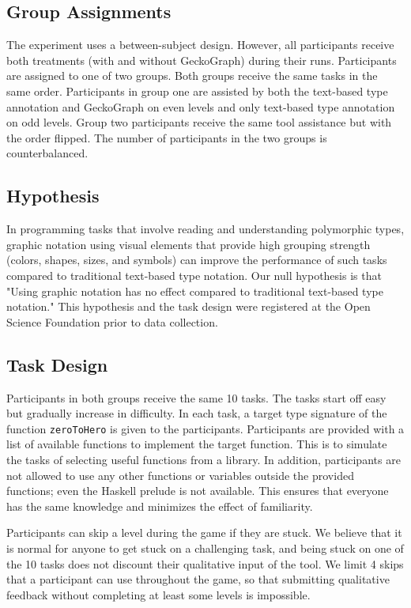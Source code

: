 \subsection{Group Assignments}

The experiment uses a between-subject design. However, all participants receive both treatments (with and without GeckoGraph) during their runs.
Participants are assigned to one of two groups. Both groups receive the same tasks in the same order. Participants in group one are assisted by both the text-based type annotation and GeckoGraph on even levels and only text-based type annotation on odd levels. Group two participants receive the same tool assistance but with the order flipped. The number of participants in the two groups is counterbalanced.

\subsection{Hypothesis}
In programming tasks that involve reading and understanding polymorphic types, graphic notation using visual elements that provide high grouping strength (colors, shapes, sizes, and symbols) can improve the performance of such tasks compared to traditional text-based type notation. Our null hypothesis is that "Using graphic notation has no effect compared to traditional text-based type notation." This hypothesis and the task design were registered at the Open Science Foundation prior to data collection. 

\subsection{Task Design} \label{subsection:task}
Participants in both groups receive the same 10 tasks. The tasks start off easy but gradually increase in difficulty.  In each task, a target type signature of the function \texttt{zeroToHero} is given to the participants. Participants are provided with a list of available functions to implement the target function. This is to simulate the tasks of selecting useful functions from a library. In addition, participants are not allowed to use any other functions or variables outside the provided functions; even the Haskell prelude is not available. This ensures that everyone has the same knowledge and minimizes the effect of familiarity. 

Participants can skip a level during the game if they are stuck. We believe that it is normal for anyone to get stuck on a challenging task, and being stuck on one of the 10 tasks does not discount their qualitative input of the tool. We limit 4 skips that a participant can use throughout the game, so that submitting qualitative feedback without completing at least some levels is impossible. 

